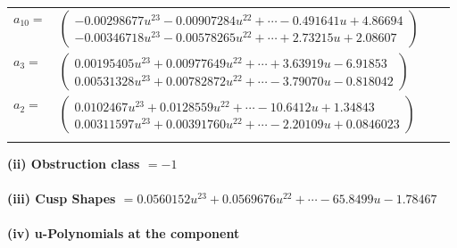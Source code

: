 \documentclass[1p]{elsarticle_modified}
\theoremstyle{definition}
\begin{document}
\begin{tabular}{m{7pt} m{180pt} m{7pt} m{180pt} }
\flushright $a_{10}=$&$\begin{pmatrix}-0.00298677 u^{23}-0.00907284 u^{22}+\cdots-0.491641 u+4.86694\\-0.00346718 u^{23}-0.00578265 u^{22}+\cdots+2.73215 u+2.08607\end{pmatrix}$ \\
\flushright $a_{3}=$&$\begin{pmatrix}0.00195405 u^{23}+0.00977649 u^{22}+\cdots+3.63919 u-6.91853\\0.00531328 u^{23}+0.00782872 u^{22}+\cdots-3.79070 u-0.818042\end{pmatrix}$ \\
\flushright $a_{2}=$&$\begin{pmatrix}0.0102467 u^{23}+0.0128559 u^{22}+\cdots-10.6412 u+1.34843\\0.00311597 u^{23}+0.00391760 u^{22}+\cdots-2.20109 u+0.0846023\end{pmatrix}$\\&\end{tabular}
\flushleft \textbf{(ii) Obstruction class $= -1$}\\~\\
\flushleft \textbf{(iii) Cusp Shapes $= 0.0560152 u^{23}+0.0569676 u^{22}+\cdots-65.8499 u-1.78467$}\\~\\
\newpage\renewcommand{\arraystretch}{1}
\flushleft \textbf{(iv) u-Polynomials at the component}\newline \\
\end{document}
